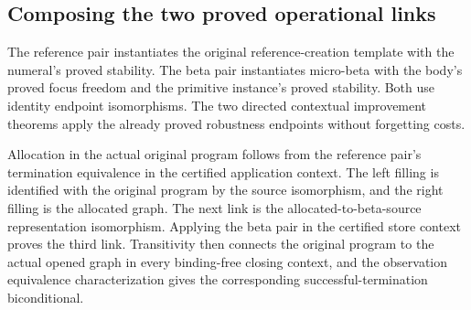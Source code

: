 \subsection{Composing the two proved operational links}

The reference pair instantiates the original reference-creation template
with the numeral's proved stability. The beta pair instantiates micro-beta
with the body's proved focus freedom and the primitive instance's proved
stability. Both use identity endpoint isomorphisms. The two directed
contextual improvement theorems apply the already proved robustness endpoints
without forgetting costs.





Allocation in the actual original program follows from the reference
pair's termination equivalence in the certified application context. The
left filling is identified with the original program by the source
isomorphism, and the right filling is the allocated graph. The next link is
the allocated-to-beta-source representation isomorphism. Applying the beta
pair in the certified store context proves the third link. Transitivity
then connects the original program to the actual opened graph in every
binding-free closing context, and the observation equivalence characterization
gives the corresponding successful-termination biconditional.






